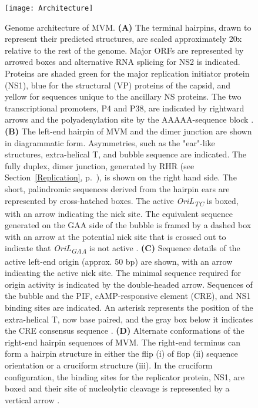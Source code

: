 \begin{figure}
\centering
  \texttt{[image: Architecture]}
  \caption[Genome architecture of MVM]
   {Genome architecture of MVM. \textbf{(A)} The terminal hairpins, drawn to represent their predicted structures, are scaled approximately 20x relative to the rest of the genome. Major ORFs are represented by arrowed boxes and alternative RNA splicing for NS2 is indicated. Proteins are shaded green for the major replication initiator protein (NS1), blue for the structural (VP) proteins of the capsid, and yellow for sequences unique to the ancillary NS proteins. The two transcriptional promoters, P4 and P38, are indicated by rightward arrows and the polyadenylation site by the AAAAA-sequence block \cite{small}. \textbf{(B)} The left-end hairpin of MVM and the dimer junction are shown in diagrammatic form. Asymmetries, such as the "ear"-like structures, extra-helical T, and bubble sequence are indicated. The fully duplex, dimer junction, generated by RHR (see Section~\ref{Replication}, p.~\pageref{Replication}), is shown on the right hand side. The short, palindromic sequences derived from the hairpin ears are represented by cross-hatched boxes. The active \textit{OriL\textsubscript{TC}} is boxed, with an arrow indicating the nick site. The equivalent sequence generated on the GAA side of the bubble is framed by a dashed box with an arrow at the potential nick site that is crossed out to indicate that \textit{OriL\textsubscript{GAA}} is not active \cite{pmid12885883, pmid16928767}. \textbf{(C)} Sequence details of the active left-end origin (approx. 50 bp) are shown, with an arrow indicating the active nick site. The minimal sequence required for origin activity is indicated by the double-headed arrow. Sequences of the bubble and the PIF, cAMP-responsive element (CRE), and NS1 binding sites are indicated. An asterisk represents the position of the extra-helical T, now base paired, and the gray box below it indicates the CRE consensus sequence \cite{pmid12885883}. \textbf{(D)} Alternate conformations of the right-end hairpin sequences of MVM. The right-end terminus can form a hairpin structure in either the flip (i) of flop (ii) sequence orientation or a cruciform structure (iii). In the cruciform configuration, the binding sites for the replicator protein, NS1, are boxed and their site of nucleolytic cleavage is represented by a vertical arrow \cite{pmid8614999}.
} 
\label{Architecture}
\end{figure}


